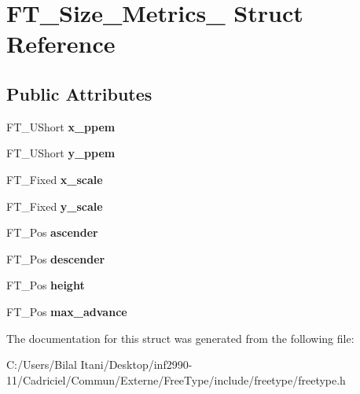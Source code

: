 \hypertarget{struct_f_t___size___metrics__}{}\section{F\+T\+\_\+\+Size\+\_\+\+Metrics\+\_\+ Struct Reference}
\label{struct_f_t___size___metrics__}
\subsection*{Public Attributes}
\begin{DoxyCompactItemize}
\item 
F\+T\+\_\+\+U\+Short {\bfseries x\+\_\+ppem}\hypertarget{struct_f_t___size___metrics___abb42b175a3450e9d8b84483f166d6c8a}{}\label{struct_f_t___size___metrics___abb42b175a3450e9d8b84483f166d6c8a}

\item 
F\+T\+\_\+\+U\+Short {\bfseries y\+\_\+ppem}\hypertarget{struct_f_t___size___metrics___abcdb70cb9e39a74679bc39c07f3275f7}{}\label{struct_f_t___size___metrics___abcdb70cb9e39a74679bc39c07f3275f7}

\item 
F\+T\+\_\+\+Fixed {\bfseries x\+\_\+scale}\hypertarget{struct_f_t___size___metrics___a5e92028bb9881e107a6fb75d557eaff1}{}\label{struct_f_t___size___metrics___a5e92028bb9881e107a6fb75d557eaff1}

\item 
F\+T\+\_\+\+Fixed {\bfseries y\+\_\+scale}\hypertarget{struct_f_t___size___metrics___a1f8b1cb3538b9920127f721dd061379d}{}\label{struct_f_t___size___metrics___a1f8b1cb3538b9920127f721dd061379d}

\item 
F\+T\+\_\+\+Pos {\bfseries ascender}\hypertarget{struct_f_t___size___metrics___ab5fde60a2661d7b774f61c264a2a6070}{}\label{struct_f_t___size___metrics___ab5fde60a2661d7b774f61c264a2a6070}

\item 
F\+T\+\_\+\+Pos {\bfseries descender}\hypertarget{struct_f_t___size___metrics___a9b2ca3a4391803e8721ed99eb9953d52}{}\label{struct_f_t___size___metrics___a9b2ca3a4391803e8721ed99eb9953d52}

\item 
F\+T\+\_\+\+Pos {\bfseries height}\hypertarget{struct_f_t___size___metrics___ae3361e264fb8a9e669f118bdb244439b}{}\label{struct_f_t___size___metrics___ae3361e264fb8a9e669f118bdb244439b}

\item 
F\+T\+\_\+\+Pos {\bfseries max\+\_\+advance}\hypertarget{struct_f_t___size___metrics___ac315a7a834ac1a57c7169ce021718958}{}\label{struct_f_t___size___metrics___ac315a7a834ac1a57c7169ce021718958}

\end{DoxyCompactItemize}


The documentation for this struct was generated from the following file\+:\begin{DoxyCompactItemize}
\item 
C\+:/\+Users/\+Bilal Itani/\+Desktop/inf2990-\/11/\+Cadriciel/\+Commun/\+Externe/\+Free\+Type/include/freetype/freetype.\+h\end{DoxyCompactItemize}
